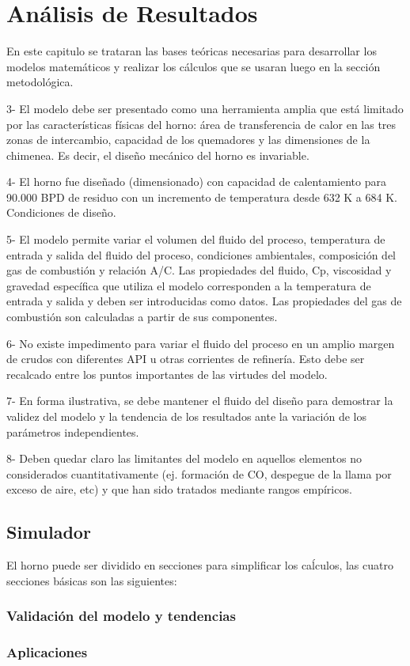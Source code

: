 \chapter{Análisis de Resultados}

\par En este capitulo se trataran las bases teóricas necesarias para desarrollar los modelos matemáticos y realizar los cálculos que se usaran luego en la sección metodológica. 

3-      El modelo debe ser presentado como una herramienta amplia que está limitado por las características físicas del horno: área de transferencia de calor en las tres zonas de intercambio, capacidad de los quemadores y las dimensiones de la chimenea. Es decir, el diseño mecánico del horno es invariable.

4-      El horno   fue diseñado (dimensionado)  con capacidad de calentamiento para 90.000 BPD de residuo  con un incremento de temperatura desde  632 K a 684 K. Condiciones de diseño.

5-      El modelo permite variar el volumen del fluido del proceso, temperatura de entrada y salida del fluido del proceso, condiciones ambientales, composición del gas de combustión y relación A/C. Las propiedades del fluido, Cp, viscosidad y gravedad específica que utiliza el modelo corresponden a la temperatura de entrada y salida y deben ser introducidas como datos. Las propiedades del gas de combustión son calculadas a partir de sus componentes.

6-      No existe impedimento para variar el fluido del proceso en un amplio margen de crudos con diferentes API u otras corrientes de refinería. Esto debe ser recalcado entre los puntos importantes de las virtudes del modelo.

7-      En forma ilustrativa, se debe mantener el fluido del diseño para demostrar la validez del modelo y  la tendencia de los resultados ante la variación de los parámetros independientes.

8-      Deben quedar claro las limitantes del modelo en aquellos elementos no considerados cuantitativamente (ej. formación de CO, despegue de la llama por exceso de aire, etc) y que han sido tratados mediante rangos empíricos.

\section{Simulador}

\par El horno puede ser dividido en secciones para simplificar los ca\'lculos, las cuatro secciones b\'asicas son las siguientes:

\subsection{Validación del modelo y tendencias}
\subsection{Aplicaciones}